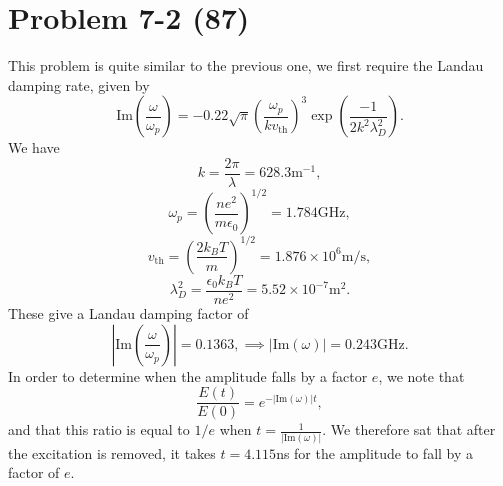 \section*{Problem 7-2 (87)}
\label{sec:7-2}
This problem is quite similar to the previous one, we first require the Landau damping rate, given by
\begin{equation*}
\text{Im}(\dfrac{\omega}{\omega_p}) = -0.22\sqrt{\pi}\left(\dfrac{\omega_p}{kv_\text{th}} \right)^3\exp\left(\dfrac{-1}{2k^2\lambda_D^2}\right).
\end{equation*}
We have
\begin{equation*}
	k = \dfrac{2\pi}{\lambda} = 628.3\text{m}^{-1},
\end{equation*}
\begin{equation*}
\omega_p = \left(\dfrac{ne^2}{m\epsilon_0}\right)^{1/2} = 1.784 \text{GHz},
\end{equation*}
\begin{equation*}
v_\text{th} = \left(\dfrac{2k_BT}{m}\right)^{1/2} = 1.876\times 10^6 \text{m/s},
\end{equation*}
\begin{equation*}
\lambda_D^2 = \dfrac{\epsilon_0k_BT}{ne^2} = 5.52 \times 10^{-7}\text{m}^{2}.
\end{equation*}
These give a Landau damping factor of
\begin{equation*}
	\left|\text{Im}\left(\dfrac{\omega}{\omega_p}\right)\right| = 0.1363, \implies \left|\text{Im}\left(\omega\right)\right| = 0.243\text{GHz}.
\end{equation*}
In order to determine when the amplitude falls by a factor \(e\), we note that
\begin{equation*}
	\dfrac{E(t)}{E(0)} = e^{-|\text{Im}(\omega)|t},
\end{equation*}
and that this ratio is equal to \(1/e \) when \( t = \frac{1}{|\text{Im}(\omega)|} \).
We therefore sat that after the excitation is removed, it takes \(t = 4.115\)ns for the amplitude to fall by a factor of \(e\).

